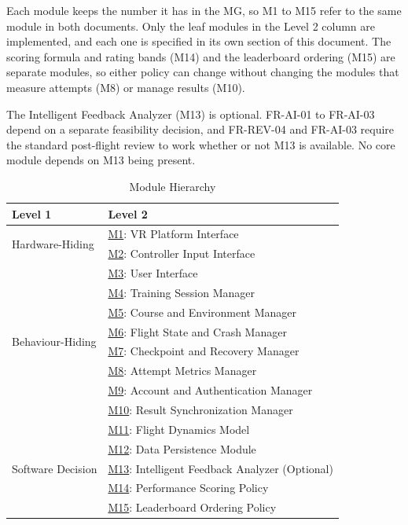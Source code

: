 \documentclass[12pt, titlepage]{article}
\newcommand{\Mref}[1]{\hyperref[sec:M#1]{M#1}}
\begin{document}
Each module keeps the number it has in the MG, so M1 to M15 refer to the same
module in both documents. Only the leaf modules in the Level 2 column are
implemented, and each one is specified in its own section of this document.
The scoring formula and rating bands (M14) and the leaderboard ordering (M15)
are separate modules, so either policy can change without changing the modules
that measure attempts (M8) or manage results (M10).

The Intelligent Feedback Analyzer (M13) is optional. FR-AI-01 to FR-AI-03
depend on a separate feasibility decision, and FR-REV-04 and FR-AI-03 require
the standard post-flight review to work whether or not M13 is available. No core
module depends on M13 being present.

\begin{table}[h!]
\centering
\begin{tabular}{p{} p{}}
\toprule
\textbf{Level 1} & \textbf{Level 2}\\
\midrule

\multirow{2}{0.3\textwidth}{Hardware-Hiding}
& \Mref{1}: VR Platform Interface\\
& \Mref{2}: Controller Input Interface\\
\midrule

\multirow{8}{0.3\textwidth}{Behaviour-Hiding}
& \Mref{3}: User Interface\\
& \Mref{4}: Training Session Manager\\
& \Mref{5}: Course and Environment Manager\\
& \Mref{6}: Flight State and Crash Manager\\
& \Mref{7}: Checkpoint and Recovery Manager\\
& \Mref{8}: Attempt Metrics Manager\\
& \Mref{9}: Account and Authentication Manager\\
& \Mref{10}: Result Synchronization Manager\\
\midrule

\multirow{5}{0.3\textwidth}{Software Decision}
& \Mref{11}: Flight Dynamics Model\\
& \Mref{12}: Data Persistence Module\\
& \Mref{13}: Intelligent Feedback Analyzer (Optional)\\
& \Mref{14}: Performance Scoring Policy\\
& \Mref{15}: Leaderboard Ordering Policy\\
\bottomrule

\end{tabular}
\caption{Module Hierarchy}
\label{TblMH}
\end{table}
\end{document}
